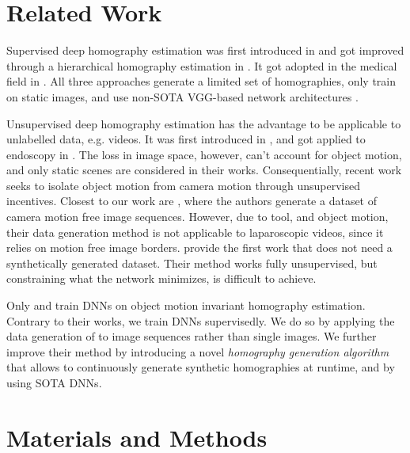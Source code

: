 \section{Related Work}

Supervised deep homography estimation was first introduced in \cite{detone2016deep} and got improved through a hierarchical homography estimation in \cite{erlik2017homography}. It got adopted in the medical field in \cite{bano2020deep}. All three approaches generate a limited set of homographies, only train on static images, and use non-SOTA VGG-based network architectures \cite{simonyan2014very}.

Unsupervised deep homography estimation has the advantage to be applicable to unlabelled data, e.g. videos. It was first introduced in \cite{nguyen2018unsupervised}, and got applied to endoscopy in \cite{gomes2019unsupervised}. The loss in image space, however, can't account for object motion, and only static scenes are considered in their works. Consequentially, recent work seeks to isolate object motion from camera motion through unsupervised incentives. Closest to our work are \citet{le2020deep}, where the authors generate a dataset of camera motion free image sequences. However, due to tool, and object motion, their data generation method is not applicable to laparoscopic videos, since it relies on motion free image borders. \citet{zhang2020content} provide the first work that does not need a synthetically generated dataset. Their method works fully unsupervised, but constraining what the network minimizes, is difficult to achieve.

Only \cite{le2020deep} and \cite{zhang2020content} train DNNs on object motion invariant homography estimation. Contrary to their works, we train DNNs supervisedly. We do so by applying the data generation of \citet{detone2016deep} to image sequences rather than single images. We further improve their method by introducing a novel \textit{homography generation algorithm} that allows to continuously generate synthetic homographies at runtime, and by using SOTA DNNs.

\section{Materials and Methods}

